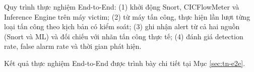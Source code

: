 \documentclass[../DoAn.tex]{subfiles}
\begin{document}
Quy trình thực nghiệm End-to-End: (1) khởi động Snort, CICFlowMeter và Inference Engine trên máy victim; (2) từ máy tấn công, thực hiện lần lượt từng loại tấn công theo kịch bản có kiểm soát; (3) ghi nhận alert từ cả hai nguồn (Snort và ML) và đối chiếu với nhãn tấn công thực tế; (4) đánh giá detection rate, false alarm rate và thời gian phát hiện.

Kết quả thực nghiệm End-to-End được trình bày chi tiết tại Mục \ref{sec:tn-e2e}.
\end{document}
